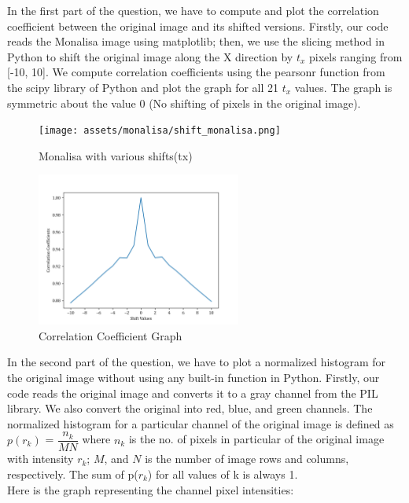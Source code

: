 \documentclass{article}
\begin{document}
In the first part of the question, we have to compute and plot the correlation
coefficient between the original image and its shifted versions. Firstly, our code
reads the Monalisa image using matplotlib; then, we use the slicing method in Python to
shift the original image along the X direction by $t_x$ pixels ranging from [-10, 10].
We compute correlation coefficients using the pearsonr function from the scipy library
of Python and plot the graph for all 21 $t_x$ values. The graph is symmetric about the
value 0 (No shifting of pixels in the original image).

\begin{figure}[H]
    \centering
    \texttt{[image: assets/monalisa/shift\_monalisa.png]}
    \caption{Monalisa with various shifts(tx)}
    \label{fig:shift_monalisa}
\end{figure}

\begin{figure}[H]
    \centering
    \includegraphics[width=0.6\textwidth]{assets/monalisa/correlation_coefficient.png}
    \caption{Correlation Coefficient Graph}
    \label{fig:correlation_coefficient}
\end{figure}

In the second part of the question, we have to plot a normalized histogram for the
original image without using any built-in function in Python. Firstly, our code reads
the original image and converts it to a gray channel from the PIL library. We also
convert the original into red, blue, and green channels. The normalized histogram for a
particular channel of the original image is defined as $p(r_k)$ = $\dfrac{n_k}{MN}$ where
$n_k$ is the no. of pixels in particular of the original image with intensity $r_k$; $M$,
and $N$ is the number of image rows and columns, respectively. The sum of p($r_k$) for all
values of k is always 1.
\\[5pt]
Here is the graph representing the channel pixel intensities:
\end{document}
